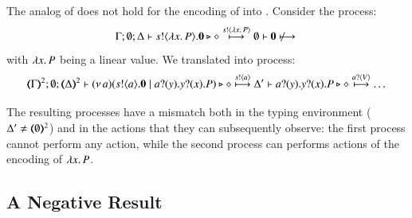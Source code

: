 \documentclass[runningheads]{llncs}
\begin{document}
{\begin{proposition}
\begin{enumerate}[1.]
	\end{enumerate}
\end{proposition}

The analog of  does not hold for the encoding of \HOp into \sessp.
Consider the \HOp process:
\[
	\Gamma; \es; \Delta \proves \bout{s}{\abs{x}{P}} \inact \hastype \Proc \hby{\bactout{s}{\abs{x} P}} \es \proves \inact \not \hby{}
\]
with $\lambda x.\,P$ being a linear value.
We translated into \sessp process:
\[\tmap{\Gamma}{2}; \es; \tmap{\Delta}{2} \proves \newsp{a}{\bout{s}{a} \inact \Par \binp{a}{y} \binp{y}{x} P} \hastype \Proc
	 \hby{\bactout{s}{a}} \Delta' \proves \binp{a}{y} \binp{y}{x} P \hastype \Proc
\hby{\bactinp{a}{V}} \dots
\]


\noi The resulting processes have a mismatch both in the typing
environment ($\Delta' \not= (\!\!\langle\emptyset\rangle\!\!)^{2}$)
and in the actions that they can %
subsequently observe: the first process
cannot perform any action, while the second process
can performs actions of the encoding of $\lambda x.\,P$.



\subsection{A Negative Result}
\label{ss:negative}
%

}
\end{document}
